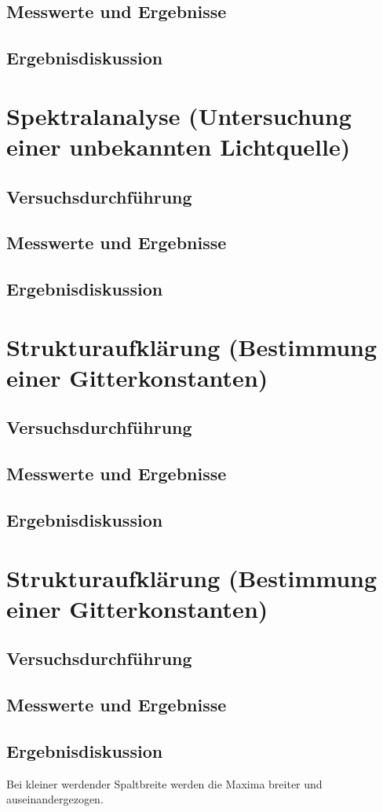 \documentclass{scrartcl}
\begin{document}
\subsection{Messwerte und Ergebnisse}
\subsection{Ergebnisdiskussion}

\section{Spektralanalyse (Untersuchung einer unbekannten Lichtquelle)}
\subsection{Versuchsdurchführung}
\subsection{Messwerte und Ergebnisse}
\subsection{Ergebnisdiskussion}

\section{Strukturaufklärung (Bestimmung einer Gitterkonstanten)}
\subsection{Versuchsdurchführung}
\subsection{Messwerte und Ergebnisse}
\subsection{Ergebnisdiskussion}

\section{Strukturaufklärung (Bestimmung einer Gitterkonstanten)}
\subsection{Versuchsdurchführung}
\subsection{Messwerte und Ergebnisse}
\subsection{Ergebnisdiskussion}
Bei kleiner werdender Spaltbreite werden die Maxima breiter und auseinandergezogen.
\end{document}

